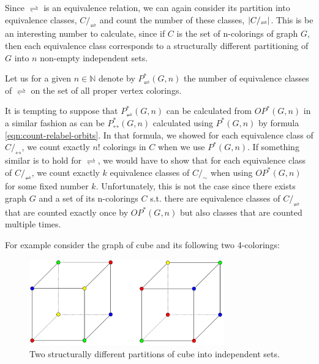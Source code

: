 \begin{highlight}
Since $\rightleftharpoons$ is an equivalence relation, we can again consider its partition into equivalence classes, $C/_\rightleftharpoons$ and count the number of these classes, $\left|{C/_\rightleftharpoons}\right|$. This is be an interesting number to calculate, since if $C$ is the set of n-colorings of graph $G$, then each equivalence class corresponds to a structurally different partitioning of $G$ into $n$ non-empty independent sets.

\begin{defn}
    Let us for a given $n \in \mathbb{N}$ denote by $P^*_{\rightleftharpoons}(G,n)$ the number of equivalence classes of $\rightleftharpoons$ on the set of all proper vertex colorings. 
\end{defn}

It is tempting to suppose that $P^*_{\rightleftharpoons}(G,n)$ can be calculated from $OP^*(G,n)$ in a similar fashion as can be $P^*_{\leftrightarrow}(G,n)$ calculated using $P^*(G,n)$ by formula \ref{eqn:count-relabel-orbits}. In that formula, we showed for each equivalence class of $C/_\leftrightarrow$, we count exactly $n!$ colorings in $C$ when we use $P^*(G,n)$. If something similar is to hold for $\rightleftharpoons$, we would have to show that for each equivalence class of $C/_\rightleftharpoons$, we count exactly $k$ equivalence classes of $C/_\sim$ when using $OP^*(G,n)$ for some fixed number $k$. Unfortunately, this is not the case since there exists graph $G$ and a set of its n-colorings $C$ s.t. there are equivalence classes of $C/_\rightleftharpoons$ that are counted exactly once by $OP^*(G,n)$ but also classes that are counted multiple times.

For example consider the graph of cube and its following two 4-colorings:

\begin{figure}[H]
    \centering
    \includegraphics[width=0.75\textwidth]{Resources/Figs/example_diff_rel-aut_class_sizes.pdf}
    \caption{Two structurally different partitions of cube into independent sets.}
    \label{fig:example-cube-4-clrings-diff-classes}
\end{figure}


\end{highlight}
